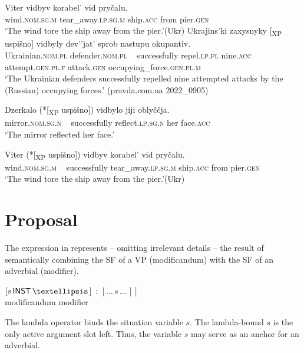 \documentclass[output=paper]{langscibook}
\begin{document}
  \ex \gll   Viter vidbyv korabel’ vid pryčalu.\\
    wind.\textsc{nom.sg.m} tear\_away.\textsc{lp.sg.m} ship.\textsc{acc} from pier.\textsc{gen}\\
    \glt ‘The wind tore the ship away from the pier.’\hfill (Ukr)\label{ex:junghanns:64c} 
\z
\ex%
    \label{ex:junghanns:65}
  \ea \gll   Ukrajins'ki zaxysnyky [\textsubscript{XP} uspišno] vidbyly dev’’jat’ sprob nastupu okupantiv.\\
    Ukrainian.\textsc{nom.pl} defender.\textsc{nom.pl} ~ successfully repel.\textsc{lp.pl} nine.\textsc{acc} attempt.\textsc{gen.pl.f} attack.\textsc{gen} occupying\_force.\textsc{gen.pl.m}\\
    \glt ‘The Ukrainian defenders successfully repelled nine attempted attacks by the (Russian) occupying forces.’ \hfill(pravda.com.ua 2022\_0905)\label{ex:junghanns:65a}

  \ex \gll   Dzerkalo (*[\textsubscript{XP} uspišno]) vidbylo jiji oblyččja.\\
    mirror.\textsc{nom.sg.n} ~ successfully reflect.\textsc{lp.sg.n} her face.\textsc{acc}\\
    \glt ‘The mirror reflected her face.’\label{ex:junghanns:65b} 

  \ex \gll   Viter (*[\textsubscript{XP} uspišno]) vidbyv korabel’ vid pryčalu.\\
    wind.\textsc{nom.sg.m} ~ successfully tear\_away.\textsc{lp.sg.m} ship.\textsc{acc} from pier.\textsc{gen}\\
    \glt ‘The wind tore the ship away from the pier.’\hfill (Ukr)\label{ex:junghanns:65c} 
\z
\z

\section{Proposal}
\label{sec:junghanns:4}

The expression in  represents -- omitting irrelevant details -- the result of semantically combining the SF of a VP (modificandum) with the SF of an adverbial (modifier).

\ea%
    \label{ex:junghanns:66}
 \gll {$λs \,  [$} {${[s \, \cnstx{inst} \, … \, ]}$}  :  {${[… \, s \, … \, ]} \, ]$} \\
       {} modificandum {} modifier \\
\z

\noindent The lambda operator binds the situation variable $s$. The lambda-bound $s$ is the only active argument slot left. Thus, the variable $s$ may serve as an anchor for an adverbial.
\end{document}
